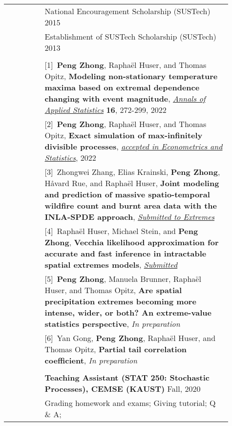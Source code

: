 \documentclass[A4, 12pt]{article}
\begin{document}
\begin{longtable}{p{0.15\linewidth}p{0.76\linewidth}}
\\
{\color{OliveGreen}{\textbf{Honors \&}}} 
& National Encouragement Scholarship (SUSTech) \hfill 2015\\
{\color{OliveGreen}{\textbf{Scholarships}}}
& Establishment of SUSTech Scholarship (SUSTech) \hfill 2013 \\
\\
\nohyphens{\color{OliveGreen}{\textbf{Publications}}}
 & [1]\ \textbf{Peng Zhong}, Rapha\"el Huser, and Thomas Opitz, \textbf{Modeling non-stationary temperature maxima based on extremal dependence changing with event magnitude}, \href{https://projecteuclid.org/journals/annals-of-applied-statistics/volume-16/issue-1/Modeling-nonstationary-temperature-maxima-based-on-extremal-dependence-changing-with/10.1214/21-AOAS1504.full}{\textit{Annals of Applied Statistics}} \textbf{16}, 272-299, 2022\\
 & [2]\ \textbf{Peng Zhong}, Rapha\"el Huser, and Thomas Opitz, \textbf{Exact simulation of max-infinitely divisible processes}, \href{https://arxiv.org/abs/2103.00533}{\textit{accepted in Econometrics and Statistics}}, 2022\\
& [3]\ Zhongwei Zhang, Elias Krainski, \textbf{Peng Zhong}, H\r{a}vard Rue, and Rapha\"el Huser, \textbf{Joint modeling and prediction of massive spatio-temporal wildfire count and burnt area data with the INLA-SPDE approach}, \href{https://arxiv.org/abs/2202.06502}{\textit{Submitted to Extremes}}\\
& [4]\ Rapha\"el Huser, Michael Stein, and \textbf{Peng Zhong}, \textbf{Vecchia likelihood approximation for accurate and fast inference in intractable spatial extremes models}, \href{https://cemse.kaust.edu.sa/sites/default/files/2022-03/Vecchia_Max-Stable.pdf}{\textit{Submitted}}\\
& [5]\ \textbf{Peng Zhong}, Manuela Brunner, Rapha\"el Huser, and Thomas Opitz, \textbf{Are spatial precipitation extremes becoming more intense, wider, or both? An extreme-value statistics perspective},  \textit{In preparation}\\
& [6]\ Yan Gong, \textbf{Peng Zhong}, Rapha\"el Huser, and Thomas Opitz, \textbf{Partial tail correlation coefficient}, \textit{In preparation} \\
\\
{\color{OliveGreen}{\textbf{Teaching}}} & \textbf{Teaching Assistant (STAT 250: Stochastic Processes), CEMSE (KAUST)} \hfill Fall, 2020 \\
{\color{OliveGreen}{\textbf{Experience}}} & Grading homework and exams; Giving tutorial; Q \& A;\\


\end{longtable}
\end{document}
